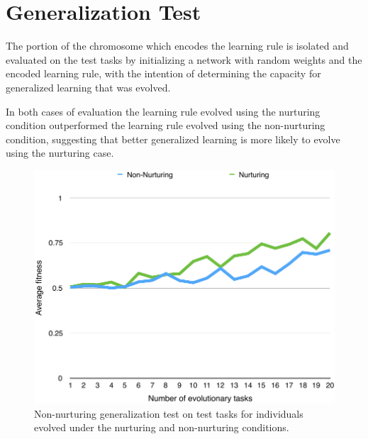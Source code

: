 \documentclass[master]{outhesis}
\begin{document}
\section{Generalization Test}

The portion of the chromosome which encodes the learning rule is isolated and evaluated on the test tasks by initializing a network with random weights and the encoded learning rule, with the intention of determining the capacity for generalized learning that was evolved.

In both cases of evaluation the learning rule evolved using the nurturing condition outperformed the learning rule evolved using the non-nurturing condition, suggesting that better generalized learning is more likely to evolve using the nurturing case.

\begin{figure}[H]
	\centering
	\includegraphics{NonNurturingGeneralizationTestPlot.pdf}
	\caption{Non-nurturing generalization test on test tasks for individuals evolved under the nurturing and non-nurturing conditions.}
\end{figure}
\end{document}
